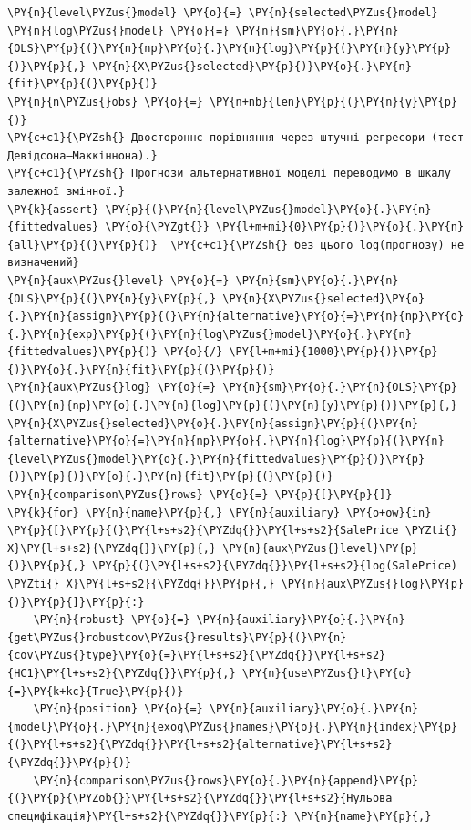 \begin{Verbatim}[commandchars=\\\{\}]
\PY{n}{level\PYZus{}model} \PY{o}{=} \PY{n}{selected\PYZus{}model}
\PY{n}{log\PYZus{}model} \PY{o}{=} \PY{n}{sm}\PY{o}{.}\PY{n}{OLS}\PY{p}{(}\PY{n}{np}\PY{o}{.}\PY{n}{log}\PY{p}{(}\PY{n}{y}\PY{p}{)}\PY{p}{,} \PY{n}{X\PYZus{}selected}\PY{p}{)}\PY{o}{.}\PY{n}{fit}\PY{p}{(}\PY{p}{)}
\PY{n}{n\PYZus{}obs} \PY{o}{=} \PY{n+nb}{len}\PY{p}{(}\PY{n}{y}\PY{p}{)}
\PY{c+c1}{\PYZsh{} Двостороннє порівняння через штучні регресори (тест Девідсона–Маккіннона).}
\PY{c+c1}{\PYZsh{} Прогнози альтернативної моделі переводимо в шкалу залежної змінної.}
\PY{k}{assert} \PY{p}{(}\PY{n}{level\PYZus{}model}\PY{o}{.}\PY{n}{fittedvalues} \PY{o}{\PYZgt{}} \PY{l+m+mi}{0}\PY{p}{)}\PY{o}{.}\PY{n}{all}\PY{p}{(}\PY{p}{)}  \PY{c+c1}{\PYZsh{} без цього log(прогнозу) не визначений}
\PY{n}{aux\PYZus{}level} \PY{o}{=} \PY{n}{sm}\PY{o}{.}\PY{n}{OLS}\PY{p}{(}\PY{n}{y}\PY{p}{,} \PY{n}{X\PYZus{}selected}\PY{o}{.}\PY{n}{assign}\PY{p}{(}\PY{n}{alternative}\PY{o}{=}\PY{n}{np}\PY{o}{.}\PY{n}{exp}\PY{p}{(}\PY{n}{log\PYZus{}model}\PY{o}{.}\PY{n}{fittedvalues}\PY{p}{)} \PY{o}{/} \PY{l+m+mi}{1000}\PY{p}{)}\PY{p}{)}\PY{o}{.}\PY{n}{fit}\PY{p}{(}\PY{p}{)}
\PY{n}{aux\PYZus{}log} \PY{o}{=} \PY{n}{sm}\PY{o}{.}\PY{n}{OLS}\PY{p}{(}\PY{n}{np}\PY{o}{.}\PY{n}{log}\PY{p}{(}\PY{n}{y}\PY{p}{)}\PY{p}{,} \PY{n}{X\PYZus{}selected}\PY{o}{.}\PY{n}{assign}\PY{p}{(}\PY{n}{alternative}\PY{o}{=}\PY{n}{np}\PY{o}{.}\PY{n}{log}\PY{p}{(}\PY{n}{level\PYZus{}model}\PY{o}{.}\PY{n}{fittedvalues}\PY{p}{)}\PY{p}{)}\PY{p}{)}\PY{o}{.}\PY{n}{fit}\PY{p}{(}\PY{p}{)}
\PY{n}{comparison\PYZus{}rows} \PY{o}{=} \PY{p}{[}\PY{p}{]}
\PY{k}{for} \PY{n}{name}\PY{p}{,} \PY{n}{auxiliary} \PY{o+ow}{in} \PY{p}{[}\PY{p}{(}\PY{l+s+s2}{\PYZdq{}}\PY{l+s+s2}{SalePrice \PYZti{} X}\PY{l+s+s2}{\PYZdq{}}\PY{p}{,} \PY{n}{aux\PYZus{}level}\PY{p}{)}\PY{p}{,} \PY{p}{(}\PY{l+s+s2}{\PYZdq{}}\PY{l+s+s2}{log(SalePrice) \PYZti{} X}\PY{l+s+s2}{\PYZdq{}}\PY{p}{,} \PY{n}{aux\PYZus{}log}\PY{p}{)}\PY{p}{]}\PY{p}{:}
    \PY{n}{robust} \PY{o}{=} \PY{n}{auxiliary}\PY{o}{.}\PY{n}{get\PYZus{}robustcov\PYZus{}results}\PY{p}{(}\PY{n}{cov\PYZus{}type}\PY{o}{=}\PY{l+s+s2}{\PYZdq{}}\PY{l+s+s2}{HC1}\PY{l+s+s2}{\PYZdq{}}\PY{p}{,} \PY{n}{use\PYZus{}t}\PY{o}{=}\PY{k+kc}{True}\PY{p}{)}
    \PY{n}{position} \PY{o}{=} \PY{n}{auxiliary}\PY{o}{.}\PY{n}{model}\PY{o}{.}\PY{n}{exog\PYZus{}names}\PY{o}{.}\PY{n}{index}\PY{p}{(}\PY{l+s+s2}{\PYZdq{}}\PY{l+s+s2}{alternative}\PY{l+s+s2}{\PYZdq{}}\PY{p}{)}
    \PY{n}{comparison\PYZus{}rows}\PY{o}{.}\PY{n}{append}\PY{p}{(}\PY{p}{\PYZob{}}\PY{l+s+s2}{\PYZdq{}}\PY{l+s+s2}{Нульова специфікація}\PY{l+s+s2}{\PYZdq{}}\PY{p}{:} \PY{n}{name}\PY{p}{,}

\end{Verbatim}
